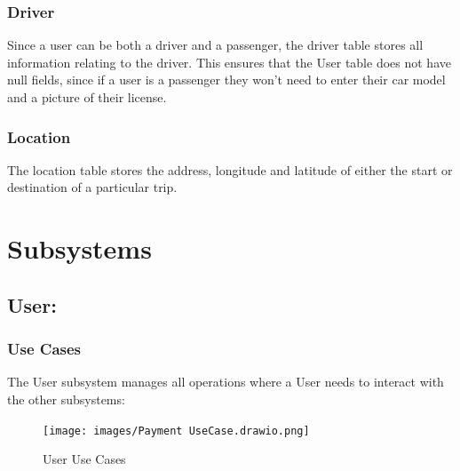 \documentclass[hidelinks, 12pt, a4paper]{article}
\begin{document}
\subsubsection{Driver}
Since a user can be both a driver and a passenger, the driver table stores all information relating to the driver. This ensures that the User table does not have null fields, since if a user is a passenger they won’t need to enter their car model and a picture of their license.

\subsubsection{Location}
The location table stores the address, longitude and latitude of either the start or destination of a particular trip.

\newpage
\section{Subsystems}

\subsection{User:}
\subsubsection{Use Cases}
The User subsystem manages all operations where a User needs to interact with the other subsystems:

\begin{figure}[H]

      \centering
      \texttt{[image: images/Payment UseCase.drawio.png]}
      \caption{User Use Cases}
      \label{fig:User UseCases}

\end{figure}
\end{document}
